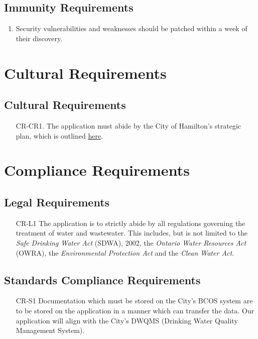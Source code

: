 \documentclass[12pt]{article}
\begin{document}
\subsection{Immunity Requirements}
\begin{enumerate} [{SR-IMR}1.]
  \item Security vulnerabilities and weaknesses should be patched
    within a week of their discovery.
\end{enumerate}

\section{Cultural Requirements}
\subsection{Cultural Requirements}
\begin{enumerate}[{CR-CR}1.]
  \item[CR-CR1.] The application must abide by the City of Hamilton's
    strategic plan, which is outlined
    \href{https://www.hamilton.ca/city-council/plans-strategies/strategies/2016-2025-strategic-plan}{here}.
\end{enumerate}

\section{Compliance Requirements}
\subsection{Legal Requirements}
\begin{itemize}
  \item[CR-L1] The application is to strictly abide by all regulations governing
    the treatment of water and wastewater. This includes, but is not limited
    to the \textit{Safe Drinking Water Act} (SDWA), 2002, the
    \textit{Ontario Water Resources Act} (OWRA), the
    \textit{Environmental Protection Act} and the \textit{Clean Water Act}.\\
\end{itemize}
\subsection{Standards Compliance Requirements}
\begin{itemize}
  \item[CR-S1] Documentation which must be stored on the City's BCOS
    system are to be stored on the application in a manner which can
    transfer the data. Our application will align with the City's
    DWQMS (Drinking Water Quality Management System).\\
\end{itemize}
\end{document}
